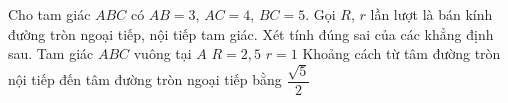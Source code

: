 \begin{ex}%
	Cho tam giác $ABC$ có $AB=3$, $AC=4$, $BC=5$. Gọi $R$, $r$ lần lượt là bán kính đường tròn ngoại tiếp, nội tiếp tam giác. Xét tính đúng sai của các khẳng định sau.
	\choiceTF
		{\True Tam giác $ABC$ vuông tại $A$}
		{\True $R=2{,}5$}
		{\True $r=1$}
		{\True Khoảng cách từ tâm đường tròn nội tiếp đến tâm đường tròn ngoại tiếp bằng $\dfrac{\sqrt5}{2}$}
\end{ex}


